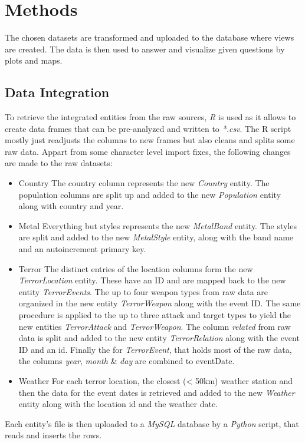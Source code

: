 \section{Methods}
The chosen datasets are transformed and uploaded to the database where views are created. The data is then used to answer and visualize given questions by plots and maps.


\subsection{Data Integration}
To retrieve the integrated entities from the raw sources, \emph{R} is used as it allows to create data frames that can be pre-analyzed and written to \emph{*.csv}. The R script mostly just readjusts the columns to new frames but also cleans and splits some raw data. Appart from some character level import fixes, the following changes are made to the raw datasets:
\begin{itemize}
\item Country
The country column represents the new \emph{Country} entity. The population columns are split up and added to the new \emph{Population} entity along with country and year. 
\item Metal
Everything but styles represents the new \emph{MetalBand} entity. The styles are split and added to the new \emph{MetalStyle} entity, along with the band name and an autoincrement primary key.
\item Terror
The distinct entries of the location columns form the new \emph{TerrorLocation} entity. These have an ID and are mapped back to the new entity \emph{TerrorEvents}. The up to four weapon types from raw data are organized in the new entity \emph{TerrorWeapon} along with the event ID. The same procedure is applied to the up to three attack and target types to yield the new entities \emph{TerrorAttack} and \emph{TerrorWeapon}. The column \emph{related} from raw data is split and added to the new entity \emph{TerrorRelation} along with the event ID and an id. Finally the for \emph{TerrorEvent}, that holds most of the raw data, the columns \emph{year}, \emph{month} \& \emph{day} are combined to eventDate.
\item Weather
For each terror location, the closest (< 50km) weather station and then the data for the event dates is retrieved and added to the new \emph{Weather} entity along with the location id and the weather date.
\end{itemize}

Each entity's file is then uploaded to a \emph{MySQL} database by a \emph{Python} script, that reads and inserts the rows.


